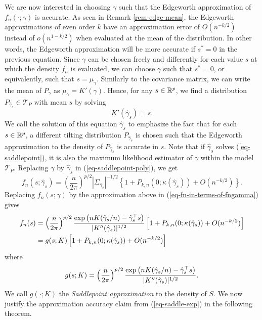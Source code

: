 We are now interested in choosing $\gamma$ such that the Edgeworth approximation of $f_n(\cdot; \gamma)$ is accurate. As seen in Remark \ref{rem-edge-mean}, the Edgeworth approximations of even order $k$ have an approximation error of $O(n^{-k/2})$ instead of $o(n^{1-k/2})$ when evaluated at the mean of the distribution. In other words, the Edgeworth approximation will be more accurate if $s^* = 0$ in the previous equation. Since $\gamma$ can be chosen freely and differently for each value $s$ at which the density $f_n$ is evaluated, we can choose $\gamma$ such that $s^* = 0$, or equivalently, such that $s = \mu_\gamma$. Similarly to the covariance matrix, we can write the mean of $P_\gamma$ as $\mu_\gamma = K'(\gamma)$. Hence, for any $s \in {\mathbb{R}^p}$, we find a distribution $P_{\hat\gamma_s} \in \mathcal{T}_P$ with mean $s$ by solving
\begin{equation} \label{eq-saddlepoint}
    K'(\hat\gamma_s) = s.
\end{equation}
We call the solution of this equation $\hat\gamma_s$ to emphasize the fact that for each $s \in {\mathbb{R}^p}$, a different tilting distribution $P_{\hat\gamma_s}$ is chosen such that the Edgeworth approximation to the density of $P_{\hat\gamma_s}$ is accurate in $s$. Note that if $\hat\gamma_s$ solves (\ref{eq-saddlepoint}), it is also the maximum likelihood estimator of $\gamma$ within the model $\mathcal{T}_P$. Replacing $\gamma$ by $\hat\gamma_{s}$ in (\ref{eq-saddlepoint-poly}), we get
\begin{equation*}
    f_n(s; \hat\gamma_s) = \left(\frac{n}{2\pi}\right)^{p/2}|\Sigma_{\hat\gamma_s}|^{-1/2}\left\{ 1 + P_{k, n}(0; \kappa(\hat\gamma_s)) + O(n^{-k/2})\right\}.
\end{equation*}
Replacing $f_n(s; \gamma)$ by the approximation above in (\ref{eq-fn-in-terms-of-fngamma}) gives
\begin{align}
    f_n(s) &= \left(\frac{n}{2\pi}\right)^{p/2} \frac{\exp\left(nK(\hat\gamma_s / n) - \hat\gamma_s^\top s\right)}{|K''(\hat\gamma_s)|^{1/2}}  \left[1 + P_{k, n}(0; \kappa(\hat\gamma_s)) + O(n^{-k/2})\right]\nonumber\\
    &= g(s; K)\left[1 + P_{k, n}(0; \kappa(\hat\gamma_s)) + O(n^{-k/2})\right] \label{eq-saddle-exp}
\end{align}
where
\begin{equation*}
    g(s; K) = \left(\frac{n}{2\pi}\right)^{p/2} \frac{\exp\left(nK(\hat\gamma_s / n) - \hat\gamma_s^\top s\right)}{|K''(\hat\gamma_s)|^{1/2}}.
\end{equation*}
We call $g(\cdot; K)$ the \textit{Saddlepoint approximation} to the density of $S$. We now justify the approximation accuracy claim from (\ref{eq-saddle-exp}) in the following theorem.

